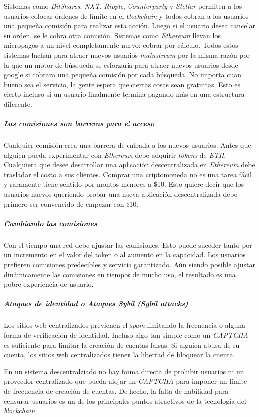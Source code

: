 \documentclass[a4paper,titlepage,final]{article}
\begin{document}
Sistemas como \textit{BitShares}, \textit{NXT}, \textit{Ripple}, \textit{Counterparty} y \textit{Stellar} permiten a los usuarios colocar órdenes de límite en el \textit{blockchain} y todos cobran a los usuarios una pequeña comisión para realizar esta acción. Luego si el usuario desea cancelar su orden, se le cobra otra comisión. Sistemas como \textit{Ethereum} llevan los micropagos a un nivel completamente nuevo: cobrar por cálculo. Todos estos sistemas luchan para atraer nuevos usuarios \textit{mainstream} por la misma razón por la que un motor de búsqueda se esforzaría para atraer nuevos usuarios desde google si cobrara una pequeña comisión por cada búsqueda. No importa cuan bueno sea el servicio, la gente espera que ciertas cosas sean gratuitas. Esto es cierto incluso si un usuario finalmente termina pagando más en una estructura diferente.

\subparagraph{Las comisiones son barreras para el acceso}

Cualquier comisión crea una barrera de entrada a los nuevos usuarios. Antes que alguien pueda experimentar con \textit{Ethereum} debe adquirir \textit{tokens} de \textit{ETH}. Cualquiera que desee desarrollar una aplicación descentralizada en \textit{Ethereum} debe trasladar el costo a sus clientes. Comprar una criptomoneda no es una tarea fácil y raramente tiene sentido por montos menores a \$10. Esto quiere decir que los usuarios nuevos queriendo probar una nueva aplicación descentralizada debe primero ser convencido de empezar con \$10.

\subparagraph{Cambiando las comisiones}

Con el tiempo una red debe ajustar las comisiones. Esto puede suceder tanto por un incremento en el valor del token o al aumento en la capacidad. Los usuarios prefieren comisiones predecibles y servicio garantizado. Aún siendo posible ajustar dinámicamente las comisiones en tiempos de mucho uso, el resultado es una pobre experiencia de usuario.

\subparagraph{Ataques de identidad o Ataques Sybil (\textit{Sybil attacks})}

Los sitios web centralizados previenen el \textit{spam} limitando la frecuencia o alguna forma de verificación de identidad. Incluso algo tan simple como un \textit{CAPTCHA}\cite{9} es suficiente para limitar la creación de cuentas falsas. Si alguien abusa de su cuenta, los sitios web centralizados tienen la libertad de bloquear la cuenta.

En un sistema descentralziado no hay forma directa de prohibir usuarios ni un proveedor centralizado que pueda alojar un \textit{CAPTCHA} para imponer un límite de frecuencia de creación de cuentas. De hecho, la falta de habilidad para censurar usuarios es un de los principales puntos atractivos de la tecnología del \textit{blockchain}.
\end{document}
